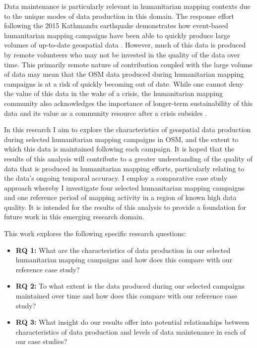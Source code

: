 Data maintenance is particularly relevant in humanitarian mapping contexts due to the unique modes of data production in this domain. The response effort following the 2015 Kathmandu earthquake demonstrates how event-based humanitarian mapping campaigns have been able to quickly produce large volumes of up-to-date geospatial data \parencite{soden_infrastructure_2016}. However, much of this data is produced by remote volunteers \parencite{eckle_quality_2015} who may not be invested in the quality of the data over time. This primarily remote nature of contribution coupled with the large volume of data may mean that the OSM data produced during humanitarian mapping campaigns is at a risk of quickly becoming out of date. While one cannot deny the value of this data in the wake of a crisis, the humanitarian mapping community also acknowledges the importance of longer-term sustainability of this data and its value as a community resource after a crisis subsides \parencite{soden_crowdsourced_2014}. 

In this research I aim to explore the characteristics of geospatial data production during selected humanitarian mapping campaigns in OSM, and the extent to which this data is maintained following each campaign. It is hoped that the results of this analysis will contribute to a greater understanding of the quality of data that is produced in humanitarian mapping efforts, particularly relating to the data’s ongoing temporal accuracy. I employ a comparative case study approach whereby I investigate four selected humanitarian mapping campaigns and one reference period of mapping activity in a region of known high data quality. It is intended for the results of this analysis to provide a foundation for future work in this emerging research domain. 

This work explores the following specific research questions: 

\begin{itemize}
    \item \textbf{RQ 1:} What are the characteristics of data production in our selected humanitarian mapping campaigns and how does this compare with our reference case study?
    \item \textbf{RQ 2:} To what extent is the data produced during our selected campaigns maintained over time and how does this compare with our reference case study? 
    \item \textbf{RQ 3:} What insight do our results offer into potential relationships between characteristics of data production and levels of data maintenance in each of our case studies? 
\end{itemize}


